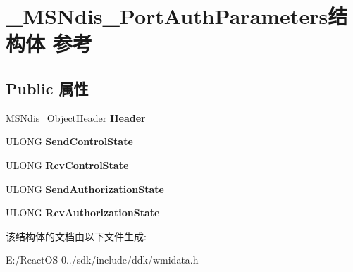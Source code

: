 \hypertarget{struct___m_s_ndis___port_auth_parameters}{}\section{\+\_\+\+M\+S\+Ndis\+\_\+\+Port\+Auth\+Parameters结构体 参考}
\label{struct___m_s_ndis___port_auth_parameters}
\subsection*{Public 属性}
\begin{DoxyCompactItemize}
\item 
\mbox{\label{struct___m_s_ndis___port_auth_parameters_a6933d9585255bf091b71d72b9d226282}} 
\hyperlink{struct___m_s_ndis___object_header}{M\+S\+Ndis\+\_\+\+Object\+Header} {\bfseries Header}
\item 
\mbox{\label{struct___m_s_ndis___port_auth_parameters_a4dc21dfeb4855842781486f594d93114}} 
U\+L\+O\+NG {\bfseries Send\+Control\+State}
\item 
\mbox{\label{struct___m_s_ndis___port_auth_parameters_ad7aa1d48806bd1c13618f33a2f698483}} 
U\+L\+O\+NG {\bfseries Rcv\+Control\+State}
\item 
\mbox{\label{struct___m_s_ndis___port_auth_parameters_a759131bc81fc224b624745be9b973a1f}} 
U\+L\+O\+NG {\bfseries Send\+Authorization\+State}
\item 
\mbox{\label{struct___m_s_ndis___port_auth_parameters_ad2d75062e42e45d79c4ce80a8a4e5fa0}} 
U\+L\+O\+NG {\bfseries Rcv\+Authorization\+State}
\end{DoxyCompactItemize}


该结构体的文档由以下文件生成\+:\begin{DoxyCompactItemize}
\item 
E\+:/\+React\+O\+S-\/0../sdk/include/ddk/wmidata.\+h\end{DoxyCompactItemize}
